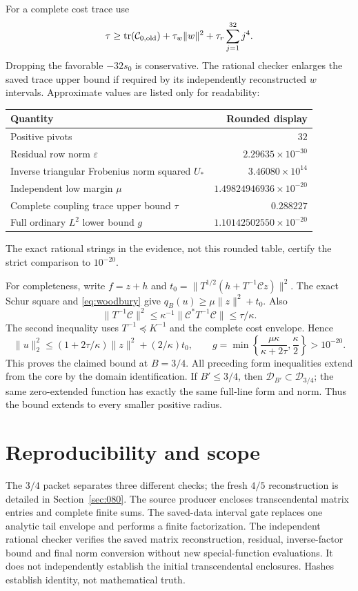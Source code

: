 \documentclass[11pt]{article}
\newcommand{\norm}[1]{\lVert#1\rVert}
\begin{document}
For a complete cost trace use
\[
 \tau\ge\operatorname{tr}(\mathcal C_{0,\rm old})
       +\tau_w\norm w^2+\tau_r\sum_{j=1}^{32}j^4.
\]
Dropping the favorable $-32s_0$ is conservative. The rational checker enlarges the saved trace upper bound if required by its independently reconstructed $w$ intervals. Approximate values are listed only for readability:
\begin{center}
\begin{tabular}{lr}
\toprule
Quantity & Rounded display\\
\midrule
Positive pivots & $32$\\
Residual row norm $\varepsilon$ & $2.29635\times10^{-30}$\\
Inverse triangular Frobenius norm squared $U_*$ & $3.46080\times10^{14}$\\
Independent low margin $\mu$ & $1.49824946936\times10^{-20}$\\
Complete coupling trace upper bound $\tau$ & $0.288227$\\
Full ordinary $L^2$ lower bound $g$ & $1.10142502550\times10^{-20}$\\
\bottomrule
\end{tabular}
\end{center}
The exact rational strings in the evidence, not this rounded table, certify the strict comparison to $10^{-20}$.

For completeness, write $f=z+h$ and $t_0=\norm{T^{1/2}(h+T^{-1}\mathcal Cz)}^2$. The exact Schur square and \eqref{eq:woodbury} give $q_B(u)\ge\mu\norm z^2+t_0$. Also
\[
 \norm{T^{-1}\mathcal C}^2
 \le\kappa^{-1}\norm{\mathcal C^*T^{-1}\mathcal C}
 \le\tau/\kappa.
\]
The second inequality uses $T^{-1}\preceq K^{-1}$ and the complete cost envelope. Hence
\[
 \norm u_2^2\le(1+2\tau/\kappa)\norm z^2+(2/\kappa)t_0,
\qquad
 g=\min\left\{\frac{\mu\kappa}{\kappa+2\tau},\frac\kappa2\right\}>10^{-20}.
\]
This proves the claimed bound at $B=3/4$. All preceding form inequalities extend from the core by the domain identification. If $B'\le3/4$, then $\mathcal D_{B'}\subset\mathcal D_{3/4}$; the same zero-extended function has exactly the same full-line form and norm. Thus the bound extends to every smaller positive radius.

\section{Reproducibility and scope}\label{sec:repro}
The $3/4$ packet separates three different checks; the fresh $4/5$ reconstruction is detailed in Section~\ref{sec:080}. The source producer encloses transcendental matrix entries and complete finite sums. The saved-data interval gate replaces one analytic tail envelope and performs a finite factorization. The independent rational checker verifies the saved matrix reconstruction, residual, inverse-factor bound and final norm conversion without new special-function evaluations. It does not independently establish the initial transcendental enclosures. Hashes establish identity, not mathematical truth.
\end{document}
